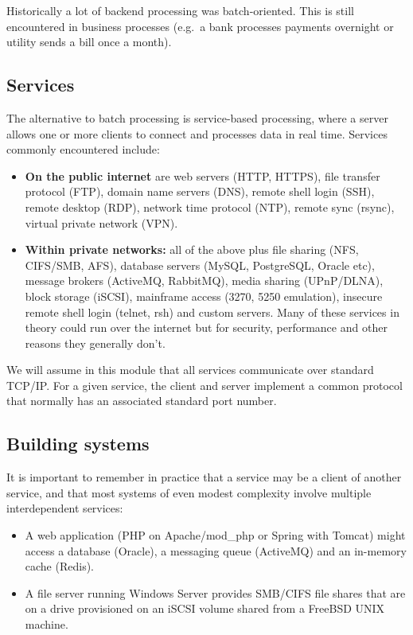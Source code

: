 Historically a lot of backend processing was batch-oriented. This is
still encountered in business processes (e.g.~a bank processes payments
overnight or utility sends a bill once a month).

\subsection{Services}
\label{sec:services}

The alternative to batch processing is service-based processing, where a
server allows one or more clients to connect and processes data in real
time. Services commonly encountered include:

\begin{itemize}
\item
  \textbf{On the public internet} are web servers (HTTP, HTTPS), file
  transfer protocol (FTP), domain name servers (DNS), remote shell login
  (SSH), remote desktop (RDP), network time protocol (NTP), remote sync
  (rsync), virtual private network (VPN).
\item
  \textbf{Within private networks:} all of the above plus file sharing
  (NFS, CIFS/SMB, AFS), database servers (MySQL, PostgreSQL, Oracle
  etc), message brokers (ActiveMQ, RabbitMQ), media sharing (UPnP/DLNA),
  block storage (iSCSI), mainframe access (3270, 5250 emulation),
  insecure remote shell login (telnet, rsh) and custom servers. Many of
  these services in theory could run over the internet but for security,
  performance and other reasons they generally don't.
\end{itemize}

We will assume in this module that all services communicate over
standard TCP/IP. For a given service, the client and server implement a
common protocol that normally has an associated standard port number.

\subsection{Building systems}
\label{sec:building-systems}

It is important to remember in practice that a service may be a client
of another service, and that most systems of even modest complexity
involve multiple interdependent services:

\begin{itemize}
\item
  A web application (PHP on Apache/mod\_php or Spring with Tomcat) might
  access a database (Oracle), a messaging queue (ActiveMQ) and an
  in-memory cache (Redis).
\item
  A file server running Windows Server provides SMB/CIFS file shares
  that are on a drive provisioned on an iSCSI volume shared from a
  FreeBSD UNIX machine.
\end{itemize}

